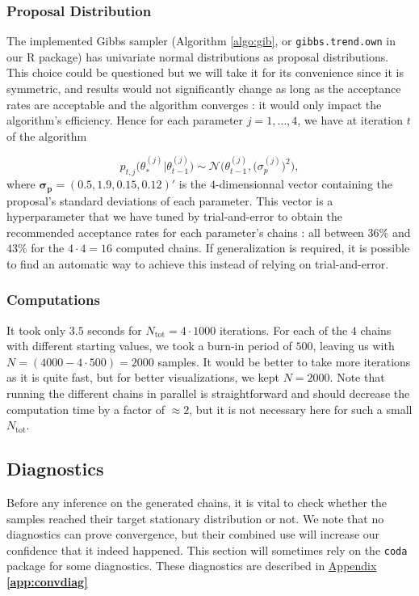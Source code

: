 \subsubsection*{Proposal Distribution}


The implemented Gibbs sampler (Algorithm \ref{algo:gib}, or \texttt{gibbs.trend.own} in our R package) has univariate normal distributions as proposal distributions. This choice could be questioned but we will take it for its convenience since it is symmetric, and results would not significantly change as long as the acceptance rates are acceptable and the algorithm converges : it would only impact the algorithm's efficiency. Hence for each parameter $j=1,\ldots,4$, we have at iteration $t$ of the algorithm

\begin{equation}
p_{t,j}\Big(\theta^{(j)}_*|\theta^{(j)}_{t-1}\Big) \sim \mathcal{N}\Big(\theta^{(j)}_{t-1},\big(\sigma^{(j)}_p\big)^2 \Big),
\end{equation}
where $\boldsymbol{\sigma_p}=(0.5, 1.9, 0.15,0.12)'$ is the $4$-dimensionnal vector containing the proposal's standard deviations of each parameter. This vector is a hyperparameter that we have tuned by trial-and-error to obtain the recommended acceptance rates for each parameter's chains : all between $36\%$ and $43\%$ for the $4\cdot 4=16$ computed chains. If generalization is required, it is possible to find an automatic way to achieve this instead of relying on trial-and-error. 


\subsubsection*{Computations} 

It took only $3.5$ seconds for $N_{\text{tot}}=4\cdot 1000$ iterations. For each of the $4$ chains with different starting values, we took a burn-in period of $500$, leaving us with $N=(4000-4\cdot 500)=2000$ samples. It would be better to take more iterations as it is quite fast, but for better visualizations, we kept $N=2000$.
Note that running the different chains in parallel is straightforward and should decrease the computation time by a factor of $\approx 2$, but it is not necessary here for such a small $N_{\text{tot}}$.
 
 
\subsection{Diagnostics}

Before any inference on the generated chains, it is vital to check whether the samples reached their target stationary distribution or not.
We note that no diagnostics can prove convergence, but their combined use will increase our confidence that it indeed happened.
This section will sometimes rely on the \texttt{coda} package for some diagnostics. These diagnostics are described in \hyperref[app:convdiag]{Appendix \textbf{\ref{app:convdiag}}}

